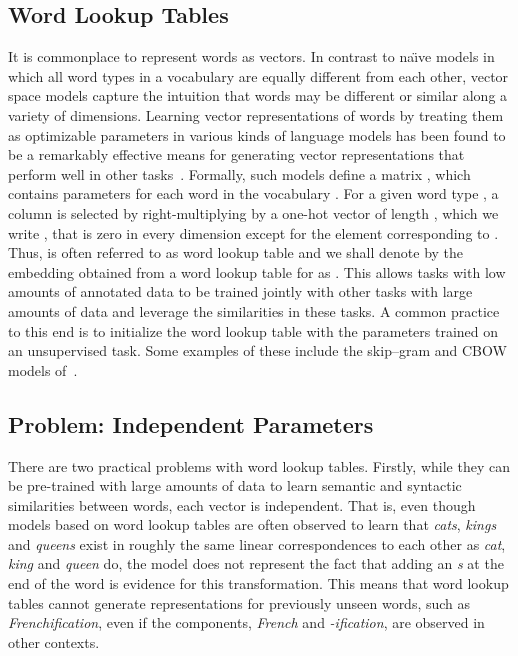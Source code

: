 \documentclass[11pt]{article}
\newcommand{\examp}[1]{\emph{#1}}
\begin{document}
\begin{CJK*}{UTF8}{gbsn}
{\subsection{Word Lookup Tables}}
It is commonplace to represent words as vectors. In contrast to na\"{\i}ve models in which all word types in a vocabulary  are equally different from each other, vector space models capture the intuition that words may be different or similar along a variety of dimensions. Learning vector representations of words by treating them as optimizable parameters in various kinds of language models has been found to be a remarkably effective means for generating vector representations that perform well in other tasks~\cite{collobert2011natural,kalchbrenner2013recurrent,liu2014recursive,chen2014fast}. Formally, such models define a matrix , which contains  parameters for each word in the vocabulary . For a given word type , a column is selected by right-multiplying  by a one-hot vector of length , which we write , that is zero in every dimension except for the element corresponding to . Thus,  is often referred to as word lookup table and we shall denote by  the embedding obtained from a word lookup table for  as . This allows tasks with low amounts of annotated data to be trained jointly with other tasks with large amounts of data and leverage the similarities in these tasks. A common practice to this end is to initialize the word lookup table with the parameters trained on an unsupervised task. Some examples of these include the skip--gram and CBOW models of~.

\subsection{Problem: Independent Parameters}
There are two practical problems with word lookup tables. Firstly, while they can be pre-trained with large amounts of data to learn semantic and syntactic similarities between words, each vector is independent. That is, even though models based on word lookup tables are often observed to learn that \examp{cats}, \examp{kings} and \examp{queens} exist in roughly the same linear correspondences to each other as \examp{cat}, \examp{king} and \examp{queen} do, the model does not represent the fact that adding an \examp{s} at the end of the word is evidence for this transformation. This means that word lookup tables cannot generate representations for previously unseen words, such as \examp{Frenchification}, even if the components, \examp{French} and \examp{-ification}, are observed in other contexts.


\end{CJK*}
\end{document}

